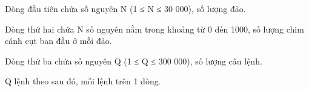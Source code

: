 Dòng đầu tiên chứa số nguyên N (1 ≤ N ≤ 30 000), số lượng đảo.  

   Dòng thứ hai chứa N số nguyên nằm trong khoảng từ 0 đến 1000, số lượng chim cánh cụt ban đầu ở mỗi đảo.  

   Dòng thứ ba chứa số nguyên Q (1 ≤ Q ≤ 300 000), số lượng câu lệnh.  

   Q lệnh theo sau đó, mỗi lệnh trên 1 dòng.